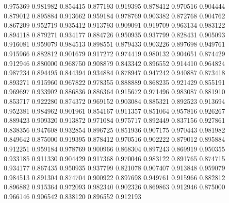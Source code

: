 0.975369
0.981982
0.854415
0.877193
0.919395
0.878412
0.970516
0.904444
0.879012
0.895884
0.913662
0.959184
0.978769
0.903382
0.872768
0.904762
0.867209
0.952719
0.935412
0.913793
0.909091
0.919709
0.963134
0.983122
0.894118
0.879271
0.934177
0.884726
0.950935
0.937799
0.828431
0.905093
0.916081
0.959079
0.984513
0.898551
0.879433
0.903226
0.897698
0.949761
0.915966
0.882812
0.901679
0.917272
0.974419
0.980132
0.904651
0.874429
0.912946
0.880000
0.968750
0.908879
0.843342
0.896552
0.914410
0.964824
0.987234
0.894495
0.844394
0.934884
0.878947
0.947242
0.940887
0.873418
0.893271
0.915960
0.967822
0.978355
0.888889
0.868235
0.921429
0.855191
0.969697
0.933902
0.886836
0.886364
0.915672
0.971496
0.983087
0.881910
0.853717
0.922280
0.874372
0.969152
0.903084
0.885321
0.892523
0.913694
0.952381
0.984962
0.901961
0.854167
0.911357
0.851064
0.957816
0.926267
0.889423
0.909320
0.913872
0.971084
0.975717
0.892449
0.837156
0.927861
0.838356
0.947608
0.932854
0.896725
0.851936
0.907175
0.970443
0.981982
0.849642
0.875000
0.919395
0.878412
0.970516
0.902222
0.879012
0.895884
0.912251
0.959184
0.978769
0.900966
0.868304
0.897243
0.869919
0.950355
0.933185
0.911330
0.904429
0.917368
0.970046
0.983122
0.891765
0.874715
0.934177
0.867435
0.950935
0.937799
0.821078
0.907407
0.913848
0.959079
0.984513
0.891304
0.874704
0.900922
0.897698
0.949761
0.915966
0.882812
0.896882
0.915364
0.972093
0.982340
0.902326
0.869863
0.912946
0.875000
0.966146
0.906542
0.838120
0.896552
0.912193
